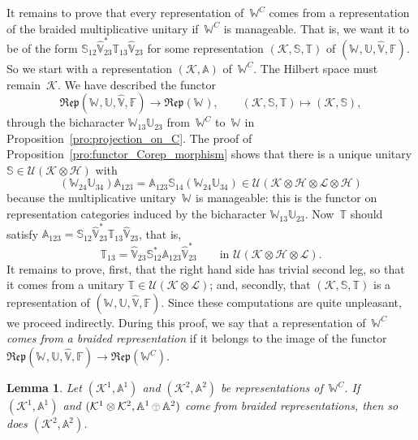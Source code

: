 \documentclass[a4paper]{amsart}
\numberwithin{equation}{section}
\theoremstyle{plain}
\numberwithin{theorem}{section}
\newtheorem{lemma}[theorem]{Lemma}
\theoremstyle{definition}
\theoremstyle{remark}
\newcommand{\tenscorep}{\mathbin{\begin{tikzpicture}[baseline,x=.75ex,y=.75ex] \draw[line width=.2pt] (-0.8,1.15)--(0.8,1.15);\draw[line width=.2pt](0,-0.25)--(0,1.15); \draw[line width=.2pt] (0,0.75) circle [radius = 1];\end{tikzpicture}}}
\newcommand*{\Corep}[1]{\mathbb{#1}}          %
\newcommand*{\DuCorep}[1]{\hat{\Corep{#1}}}   %
\newcommand*{\Corepcat}[1]{\mathfrak{Rep}(#1)}%
\newcommand*{\Multunit}[1][]{\mathbb W^{#1}}%
\newcommand*{\BrMultunit}{\mathbb F}%
\newcommand*{\Hils}[1][H]{\mathcal{#1}}%
\newcommand*{\U}{\mathcal U}%
\begin{document}
It remains to prove that every representation of~\(\Multunit[C]\)
comes from a representation of the braided multiplicative unitary
if~\(\Multunit[C]\)
is manageable.  That is, we want it to be of the form
\(\Corep{S}_{12} \DuCorep{V}_{23}^* \Corep{T}_{13} \DuCorep{V}_{23}\)
for some representation \((\Hils[K],\Corep{S},\Corep{T})\)
of \((\Multunit,\Corep{U},\DuCorep{V},\BrMultunit)\).
So we start with a representation \((\Hils[K],\Corep{A})\)
of~\(\Multunit[C]\).
The Hilbert space must remain~\(\Hils[K]\).
We have described the functor
\[
\Corepcat{\Multunit,\Corep{U},\DuCorep{V},\BrMultunit} \to
\Corepcat{\Multunit},\qquad
(\Hils[K],\Corep{S},\Corep{T})\mapsto (\Hils[K],\Corep{S}),
\]
through the bicharacter \(\Multunit_{13} \Corep{U}_{23}\)
from~\(\Multunit[C]\)
to~\(\Multunit\)
in Proposition~\ref{pro:projection_on_C}.  The proof of
Proposition~\ref{pro:functor_Corep_morphism} shows that there is a
unique unitary \(\Corep{S}\in\U(\Hils[K]\otimes\Hils)\) with
\begin{equation}
  \label{eq:induced_corep}
  (\Multunit_{24}\Corep{U}_{34})\Corep{A}_{123}
  = \Corep{A}_{123} \Corep{S}_{14} (\Multunit_{24}\Corep{U}_{34})
  \in \U(\Hils[K]\otimes \Hils \otimes \Hils[L] \otimes \Hils)
\end{equation}
because the multiplicative unitary~\(\Multunit\)
is manageable: this is the functor on representation categories
induced by the bicharacter \(\Multunit_{13} \Corep{U}_{23}\).
Now~\(\Corep{T}\)
should satisfy
\(\Corep{A}_{123} = \Corep{S}_{12} \DuCorep{V}_{23}^* \Corep{T}_{13}
\DuCorep{V}_{23}\), that is,
\[
\Corep{T}_{13} =
\DuCorep{V}_{23} \Corep{S}_{12}^* \Corep{A}_{123} \DuCorep{V}_{23}^*
\qquad\text{in }\U(\Hils[K]\otimes \Hils \otimes \Hils[L]).
\]
It remains to prove, first, that the right hand side has trivial
second leg, so that it comes from a unitary
\(\Corep{T}\in\U(\Hils[K]\otimes\Hils[L])\);
and, secondly, that \((\Hils[K],\Corep{S},\Corep{T})\)
is a representation of
\((\Multunit,\Corep{U},\DuCorep{V},\BrMultunit)\).
Since these computations are quite unpleasant, we proceed indirectly.
During this proof, we say that a
representation
of~\(\Multunit[C]\)
\emph{comes from a braided representation} if it belongs to the image
of the functor
\(\Corepcat{\Multunit,\Corep{U},\DuCorep{V},\BrMultunit}\to
\Corepcat{\Multunit[C]}\).

\begin{lemma}
  \label{lem:lift_cancel}
  Let \((\Hils[K]^1,\Corep{A}^1)\)
  and \((\Hils[K]^2,\Corep{A}^2)\)
  be representations of~\(\Multunit[C]\).
  If \((\Hils[K]^1,\Corep{A}^1)\)
  and
  \((\Hils[K]^1\otimes \Hils[K]^2,\Corep{A}^1\tenscorep \Corep{A}^2)\)
  come from braided representations, then so does
  \((\Hils[K]^2,\Corep{A}^2)\).
\end{lemma}
\end{document}
